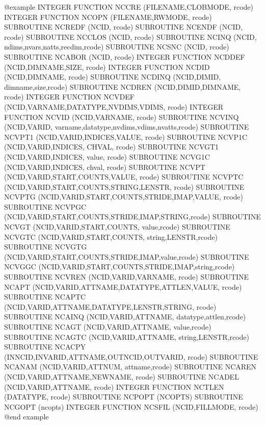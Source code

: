 {@example
INTEGER FUNCTION NCCRE (FILENAME,CLOBMODE, rcode)
INTEGER FUNCTION NCOPN (FILENAME,RWMODE, rcode)
SUBROUTINE NCREDF (NCID, rcode)
SUBROUTINE NCENDF (NCID, rcode)
SUBROUTINE NCCLOS (NCID, rcode)
SUBROUTINE NCINQ (NCID, ndims,nvars,natts,recdim,rcode)
SUBROUTINE NCSNC (NCID, rcode)
SUBROUTINE NCABOR (NCID, rcode)
INTEGER FUNCTION NCDDEF (NCID,DIMNAME,SIZE, rcode)
INTEGER FUNCTION NCDID (NCID,DIMNAME, rcode)
SUBROUTINE NCDINQ (NCID,DIMID, dimname,size,rcode)
SUBROUTINE NCDREN (NCID,DIMID,DIMNAME, rcode)
INTEGER FUNCTION NCVDEF (NCID,VARNAME,DATATYPE,NVDIMS,VDIMS, rcode)
INTEGER FUNCTION NCVID (NCID,VARNAME, rcode)
SUBROUTINE NCVINQ (NCID,VARID, varname,datatype,nvdims,vdims,nvatts,rcode)
SUBROUTINE NCVPT1 (NCID,VARID,INDICES,VALUE, rcode)
SUBROUTINE NCVP1C (NCID,VARID,INDICES, CHVAL, rcode)
SUBROUTINE NCVGT1 (NCID,VARID,INDICES, value, rcode)
SUBROUTINE NCVG1C (NCID,VARID,INDICES, chval, rcode)
SUBROUTINE NCVPT (NCID,VARID,START,COUNTS,VALUE, rcode)
SUBROUTINE NCVPTC (NCID,VARID,START,COUNTS,STRING,LENSTR, rcode)
SUBROUTINE NCVPTG (NCID,VARID,START,COUNTS,STRIDE,IMAP,VALUE, rcode)
SUBROUTINE NCVPGC (NCID,VARID,START,COUNTS,STRIDE,IMAP,STRING,rcode)
SUBROUTINE NCVGT (NCID,VARID,START,COUNTS, value,rcode)
SUBROUTINE NCVGTC (NCID,VARID,START,COUNTS, string,LENSTR,rcode)
SUBROUTINE NCVGTG (NCID,VARID,START,COUNTS,STRIDE,IMAP,value,rcode)
SUBROUTINE NCVGGC (NCID,VARID,START,COUNTS,STRIDE,IMAP,string,rcode)
SUBROUTINE NCVREN (NCID,VARID,VARNAME, rcode)
SUBROUTINE NCAPT (NCID,VARID,ATTNAME,DATATYPE,ATTLEN,VALUE, rcode)
SUBROUTINE NCAPTC (NCID,VARID,ATTNAME,DATATYPE,LENSTR,STRING, rcode)
SUBROUTINE NCAINQ (NCID,VARID,ATTNAME, datatype,attlen,rcode)
SUBROUTINE NCAGT (NCID,VARID,ATTNAME, value,rcode)
SUBROUTINE NCAGTC (NCID,VARID,ATTNAME, string,LENSTR,rcode)
SUBROUTINE NCACPY (INNCID,INVARID,ATTNAME,OUTNCID,OUTVARID, rcode)
SUBROUTINE NCANAM (NCID,VARID,ATTNUM, attname,rcode)
SUBROUTINE NCAREN (NCID,VARID,ATTNAME,NEWNAME, rcode)
SUBROUTINE NCADEL (NCID,VARID,ATTNAME, rcode)
INTEGER FUNCTION NCTLEN (DATATYPE, rcode)
SUBROUTINE NCPOPT (NCOPTS)
SUBROUTINE NCGOPT (ncopts)
INTEGER FUNCTION NCSFIL (NCID,FILLMODE, rcode)
@end example

}
